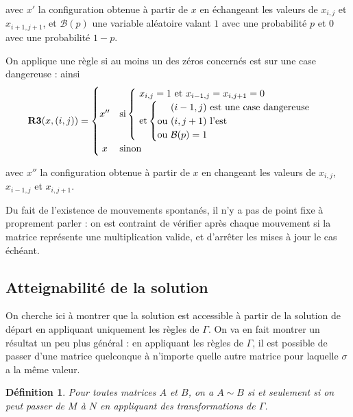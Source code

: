 \documentclass[11pt, openany]{article}
\newtheorem*{df*}{ \textbf{Définition}}{}
\begin{document}
avec $x'$ la configuration obtenue à partir de $x$ en échangeant les valeurs de $x_{i,j}$ et $x_{i+1,j+1}$, et $\mathcal{B}(p)$ une variable aléatoire valant $1$ avec une probabilité $p$ et $0$ avec une probabilité $1-p$.

On applique une règle si au moins un des zéros concernés est sur une case dangereuse : ainsi \[
\textbf{R3}(x,(i,j))=
\begin{cases}
  \hfill x'' \hfill & \text {si} \begin{cases}\text{ $x_{i,j}=1$ et $x_{i-1,j}=x_{i,j+1}=0$} \\
    \text{ et} \left\{
        \begin{tabular}{@{}c@{}l}
          &\text{ $(i-1,j)$ est une case dangereuse}\\
          \text {ou}& \text{ $(i,j+1)$ l'est}\\
          \text {ou}& \text{ $\mathcal{B}(p)=1$}\\
        \end{tabular}
      \right.
    \end{cases}
  \\
  \hfill x \hfill & \text {sinon}
\end{cases}
\]

avec $x''$ la configuration obtenue à partir de $x$ en changeant les valeurs de $x_{i,j}$, $x_{i-1,j}$ et $x_{i,j+1}$.

\medskip

Du fait de l'existence de mouvements spontanés, il n'y a pas de point fixe à proprement parler : on est contraint de vérifier après chaque mouvement si la matrice représente une multiplication valide, et d'arrêter les mises à jour le cas échéant. 

\subsection*{Atteignabilité de la solution}

On cherche ici à montrer que la solution est accessible à partir de la solution de départ en appliquant uniquement les règles de $\Gamma$. On va en fait montrer un résultat un peu plus général : en appliquant les règles de $\Gamma$, il est possible de passer d'une matrice quelconque à n'importe quelle autre matrice pour laquelle $\sigma$ a la même valeur. 

\begin{df*}
Pour toutes matrices $A$ et $B$, on a $A\sim B$ si et seulement si on peut passer de $M$ à $N$ en appliquant des transformations de $\Gamma$.
\end{df*}
\end{document}
